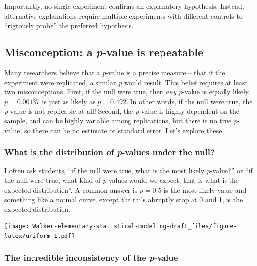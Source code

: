 \documentclass[]{book}
\begin{document}
Importantly, no single experiment confirms an explanatory hypothesis. Instead, alternative explanations require multiple experiments with different controls to ``rigrously probe'' the preferred hypothesis.

\hypertarget{misconception-a-p-value-is-repeatable}{%
\subsection{\texorpdfstring{Misconception: a \emph{p}-value is repeatable}{Misconception: a p-value is repeatable}}\label{misconception-a-p-value-is-repeatable}}

Many researchers believe that a \emph{p}-value is a precise measure -- that if the experiment were replicated, a similar \emph{p} would result. This belief requires at least two misconceptions. First, if the null were true, then \emph{any} \emph{p}-value is equally likely. \(p=0.00137\) is just as likely as \(p=0.492\). In other words, if the null were true, the \emph{p}-value is not replicable at all! Second, the \emph{p}-value is highly dependent on the sample, and can be highly variable among replications, but there is no true \emph{p}-value, so there can be no estimate or standard error. Let's explore these.

\hypertarget{what-is-the-distribution-of-p-values-under-the-null}{%
\subsubsection{\texorpdfstring{What is the distribution of \emph{p}-values under the null?}{What is the distribution of p-values under the null?}}\label{what-is-the-distribution-of-p-values-under-the-null}}

I often ask students, ``if the null were true, what is the most likely \emph{p}-value?'' or ``if the null were true, what kind of \emph{p}-values would we expect, that is what is the expected distribution''. A common answer is \(p=0.5\) is the most likely value and something like a normal curve, except the tails abruptly stop at 0 and 1, is the expected distribution.

\texttt{[image: Walker-elementary-statistical-modeling-draft\_files/figure-latex/uniform-1.pdf]}

\hypertarget{the-incredible-inconsistency-of-the-p-value}{%
\subsubsection{\texorpdfstring{The incredible inconsistency of the \emph{p}-value}{The incredible inconsistency of the p-value}}\label{the-incredible-inconsistency-of-the-p-value}}
\end{document}
